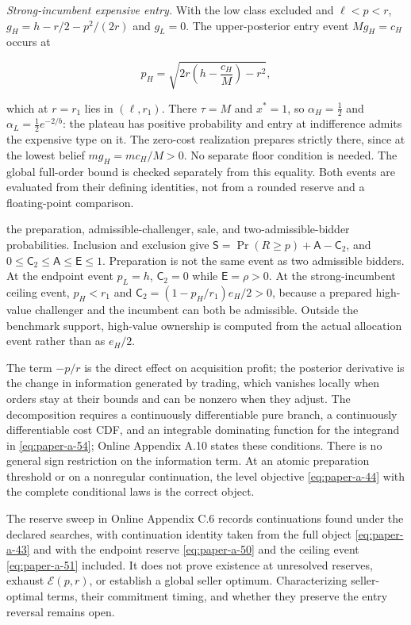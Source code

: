 \emph{Strong-incumbent expensive entry.} With the low class excluded and
\(\ell<p<r\), \(g_H=h-r/2-p^2/(2r)\) and \(g_L=0\). The upper-posterior
entry event \(Mg_H=c_H\) occurs at

\[
p_H=\sqrt{2r\left(h-\frac{c_H}{M}\right)-r^2},
\tag{A.51}\label{eq:paper-a-51}
\]

which at \(r=r_1\) lies in \((\ell,r_1)\). There \(\tau=M\) and
\(x^*=1\), so \(\alpha_H=\tfrac12\) and \(\alpha_L=\tfrac12e^{-2/b}\):
the plateau has positive probability and entry at indifference admits
the expensive type on it. The zero-cost realization prepares strictly there,
since at the lowest belief \(mg_H=mc_H/M>0\). No separate floor condition
is needed. The global full-order bound is checked
separately from this equality. Both events are evaluated from their
defining identities, not from a rounded reserve and a floating-point
comparison.

the preparation, admissible-challenger, sale, and two-admissible-bidder
probabilities. Inclusion and exclusion give
\(\mathsf S=\Pr(R\ge p)+\mathsf A-\mathsf C_2\), and
\(0\le\mathsf C_2\le\mathsf A\le\mathsf E\le1\). Preparation is not the
same event as two admissible bidders. At the endpoint event \(p_L=h\),
\(\mathsf C_2=0\) while \(\mathsf E=\rho>0\). At the strong-incumbent ceiling
event, \(p_H<r_1\) and \(\mathsf C_2=(1-p_H/r_1)e_H/2>0\), because a
prepared high-value challenger and the incumbent can both be admissible.
Outside the benchmark support, high-value ownership is computed from the
actual allocation event rather than as \(e_H/2\).

The term \(-p/r\) is the direct effect on acquisition profit; the
posterior derivative is the change in information generated by trading,
which vanishes locally when orders stay at their bounds and can be
nonzero when they adjust. The decomposition requires a continuously
differentiable pure branch, a continuously differentiable cost CDF, and
an integrable dominating function for the integrand in
\eqref{eq:paper-a-54}; Online Appendix A.10 states these conditions.
There is no general sign restriction on the information term. At an
atomic preparation threshold or on a nonregular
continuation, the level objective \eqref{eq:paper-a-44} with the
complete conditional laws is the correct object.

The reserve sweep in Online Appendix C.6 records continuations found
under the declared searches, with continuation identity taken from the
full object \eqref{eq:paper-a-43} and with the endpoint reserve
\eqref{eq:paper-a-50} and the ceiling event \eqref{eq:paper-a-51} included. It does not
prove existence at unresolved reserves, exhaust \(\mathcal E(p,r)\), or
establish a global seller optimum. Characterizing seller-optimal terms,
their commitment timing, and whether they preserve the entry reversal
remains open.
